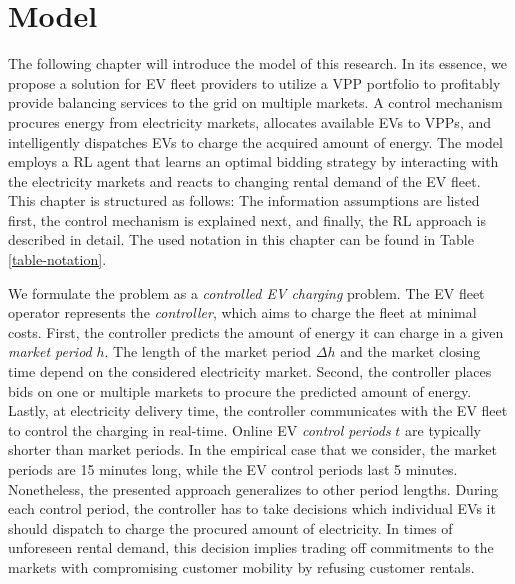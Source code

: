 \documentclass[a4paper, 12pt]{article}
\begin{document}
\clearpage

\section{Model}
\label{sec:org19cb038}
The following chapter will introduce the model of this research. In its essence,
we propose a solution for EV fleet providers to utilize a VPP portfolio to
profitably provide balancing services to the grid on multiple markets. A control
mechanism procures energy from electricity markets, allocates available EVs to
VPPs, and intelligently dispatches EVs to charge the acquired amount of energy.
The model employs a RL agent that learns an optimal bidding strategy by
interacting with the electricity markets and reacts to changing rental demand of
the EV fleet. This chapter is structured as follows: The information assumptions
are listed first, the control mechanism is explained next, and finally, the RL
approach is described in detail. The used notation in this chapter can be found
in Table \ref{table-notation}.

We formulate the problem as a \emph{controlled EV charging} problem. The EV fleet
operator represents the \emph{controller}, which aims to charge the fleet at minimal
costs. First, the controller predicts the amount of energy it can charge in a
given \emph{market period} \(h\). The length of the market period \(\Delta h\) and the
market closing time depend on the considered electricity market. Second, the
controller places bids on one or multiple markets to procure the predicted
amount of energy. Lastly, at electricity delivery time, the controller
communicates with the EV fleet to control the charging in real-time. Online EV
\emph{control periods} \(t\) are typically shorter than market periods. In the
empirical case that we consider, the market periods are 15 minutes long, while
the EV control periods last 5 minutes. Nonetheless, the presented approach
generalizes to other period lengths. During each control period, the controller
has to take decisions which individual EVs it should dispatch to charge the
procured amount of electricity. In times of unforeseen rental demand, this
decision implies trading off commitments to the markets with compromising
customer mobility by refusing customer rentals.
\end{document}
